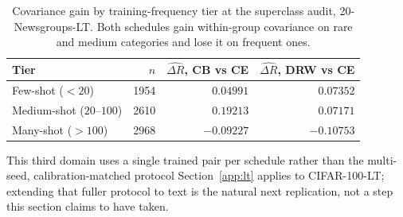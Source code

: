 \documentclass[preprint,times,10pt,a4paper]{elsarticle}
\theoremstyle{plain}
\theoremstyle{definition}
\begin{document}
\begin{table}[t]
\centering
\caption{Covariance gain by training-frequency tier at the superclass audit,
20-Newsgroups-LT. Both schedules gain within-group covariance on rare and medium categories
and lose it on frequent ones.}
\label{tab:textlt-tier}
\begin{tabular}{@{}lrrr@{}}
\toprule
Tier & $n$ & $\widehat{\Delta R}$, CB vs CE & $\widehat{\Delta R}$, DRW vs CE \\
\midrule
Few-shot ($<20$)          & 1954 & $0.04991$  & $0.07352$  \\
Medium-shot ($20$--$100$) & 2610 & $0.19213$  & $0.07171$  \\
Many-shot ($>100$)        & 2968 & $-0.09227$ & $-0.10753$ \\
\bottomrule
\end{tabular}
\end{table}

This third domain uses a single trained pair per schedule rather than the multi-seed,
calibration-matched protocol Section~\ref{app:lt} applies to CIFAR-100-LT; extending
that fuller protocol to text is the natural next replication, not a step this section
claims to have taken.



\end{document}
